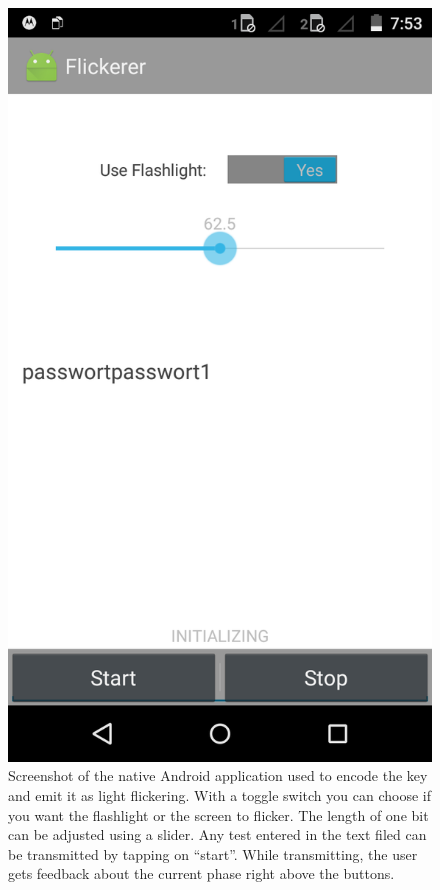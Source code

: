 \documentclass{sig-alternate} %
\begin{document}
\begin{figure}
	\centering
	\includegraphics[scale=.15]{images/screen_native.png}
	\caption{Screenshot of the native Android application used to encode the key and emit it as light flickering. With a toggle switch you can choose if you want the flashlight or the screen to flicker. The length of one bit can be adjusted using a slider. Any test entered in the text filed can be transmitted by tapping on ``start''. While transmitting, the user gets feedback about the current phase right above the buttons.}
	\label{fig:screenshot}
\end{figure}
\end{document}
